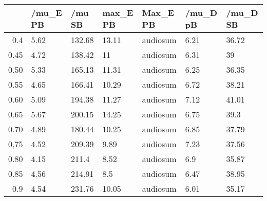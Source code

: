 \begin{table}[ht]
\centering
\begin{tabular}{rllllll}
  \hline
 & /mu\_E PB & /mu SB & max\_E PB & Max\_E PB & /mu\_D pB & /mu\_D SB \\ 
  \hline
0.4 & 5.62 & 132.68 & 13.11 & audiosum & 6.21 & 36.72 \\ 
  0.45 & 4.72 & 138.42 & 11 & audiosum & 6.31 & 39 \\ 
  0.50 & 5.33 & 165.13 & 11.31 & audiosum & 6.25 & 36.35 \\ 
  0.55 & 4.65 & 166.41 & 10.29 & audiosum & 6.72 & 38.21 \\ 
  0.60 & 5.09 & 194.38 & 11.27 & audiosum & 7.12 & 41.01 \\ 
  0.65 & 5.67 & 200.15 & 14.25 & audiosum & 6.75 & 39.3 \\ 
  0.70 & 4.89 & 180.44 & 10.25 & audiosum & 6.85 & 37.79 \\ 
  0,75 & 4.52 & 209.39 & 9.89 & audiosum & 7.23 & 37.56 \\ 
  0.80 & 4.15 & 211.4 & 8.52 & audiosum & 6.9 & 35.87 \\ 
  0.85 & 4.56 & 214.91 & 8.5 & audiosum & 6.47 & 38.95 \\ 
  0.9 & 4.54 & 231.76 & 10.05 & audiosum & 6.01 & 35.17 \\ 
   \hline
\end{tabular}
\end{table}
